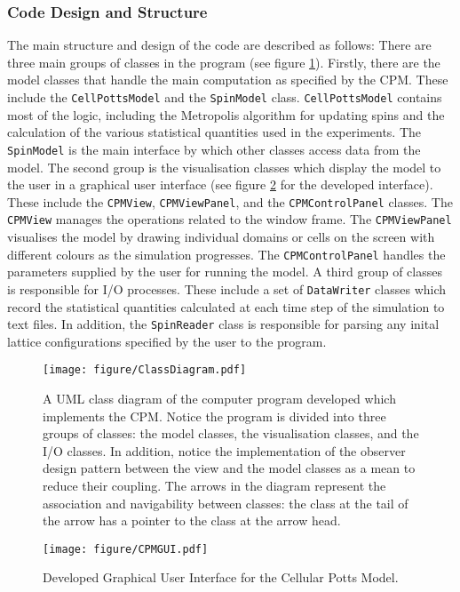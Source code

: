 \documentclass[a4paper,12pt]{article}
\begin{document}
\subsubsection{Code Design and Structure}
\label{sec:codestructure}
The main structure and design of the code are described as follows: There are three main groups of classes in the program (see figure \ref{fig:ClassDiagram}). Firstly, there are the model classes that handle the main computation as specified by the CPM. These include the \texttt{CellPottsModel} and the \texttt{SpinModel} class. \texttt{CellPottsModel} contains most of the logic, including the Metropolis algorithm for updating spins and the calculation of the various statistical quantities used in the experiments. The \texttt{SpinModel} is the main interface by which other classes access data from the model. The second group is the visualisation classes which display the model to the user in a graphical user interface (see figure \ref{fig:CPMGUI} for the developed interface). These include the \texttt{CPMView}, \texttt{CPMViewPanel}, and the \texttt{CPMControlPanel} classes. The \texttt{CPMView} manages the operations related to the window frame. The \texttt{CPMViewPanel} visualises the model by drawing individual domains or cells on the screen with different colours as the simulation progresses. The \texttt{CPMControlPanel} handles the parameters supplied by the user for running the model.  A third group of classes is responsible for I/O processes. These include a set of \texttt{DataWriter} classes which record the statistical quantities calculated at each time step of the simulation to text files. In addition, the \texttt{SpinReader} class is responsible for parsing any inital lattice configurations specified by the user to the program.  
\begin{figure}[h]
\centering
\texttt{[image: figure/ClassDiagram.pdf]}
\caption{A UML class diagram of the computer program developed which implements the CPM. Notice the program is divided into three groups of classes: the model classes, the visualisation classes, and the I/O classes. In addition, notice the implementation of the observer design pattern between the view and the model classes as a mean to reduce their coupling. The arrows in the diagram represent the association and navigability between classes: the class at the tail of the arrow has a pointer to the class at the arrow head.}
\label{fig:ClassDiagram}
\end{figure}
\begin{figure}[h]
\centering
\texttt{[image: figure/CPMGUI.pdf]}
\caption{Developed Graphical User Interface for the Cellular Potts Model.}
\label{fig:CPMGUI}
\end{figure}
\FloatBarrier
\end{document}
